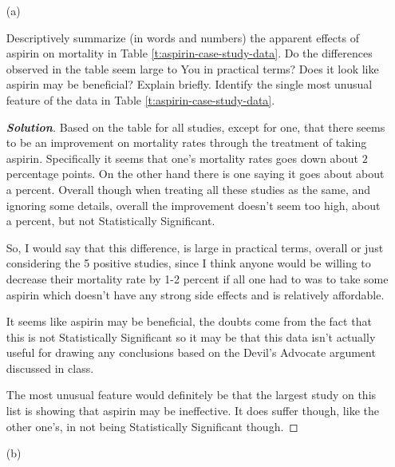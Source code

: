 \documentclass[12pt]{article}
\newenvironment{solution}{\begin{tcolorbox}[breakable]\begin{proof}[\textbf{\textit{Solution}}] }{\end{proof}\end{tcolorbox}}
\begin{document}
\begin{itemize}
\item[(a)]

\textit{} \vspace*{0.025in} Descriptively summarize (in words and numbers) the apparent effects of aspirin on mortality in Table \ref{t:aspirin-case-study-data}. \fbox{\textbf{\textit{[5 points]}}} Do the differences observed in the table seem large to You in practical terms? \fbox{\textbf{\textit{[5 points]}}} Does it look like aspirin may be beneficial? Explain briefly. \fbox{\textbf{\textit{[5 points]}}} Identify the single most unusual feature of the data in Table \ref{t:aspirin-case-study-data}. \fbox{\textbf{\textit{[5 points]}}}

\begin{solution}
    Based on the table for all studies, except for one, that there seems to be an improvement on mortality rates through the treatment of taking aspirin. Specifically it seems that one's mortality rates goes down about $2$ percentage points. On the other hand there is one saying it goes about about a percent. Overall though when treating all these studies as the same, and ignoring some details, overall the improvement doesn't seem too high, about a percent, but not Statistically Significant. 
    
    So, I would say that this difference, is large in practical terms, overall or just considering the 5 positive studies, since I think anyone would be willing to decrease their mortality rate by 1-2 percent if all one had to was to take some aspirin which doesn't have any strong side effects and is relatively affordable. 

    It seems like aspirin may be beneficial, the doubts come from the fact that this is not Statistically Significant so it may be that this data isn't actually useful for drawing any conclusions based on the Devil's Advocate argument discussed in class. 
    
    The most unusual feature would definitely be that the largest study on this list is showing that aspirin may be ineffective. It does suffer though, like the other one's, in not being Statistically Significant though. 
\end{solution}

\item[(b)]


\end{itemize}
\end{document}
